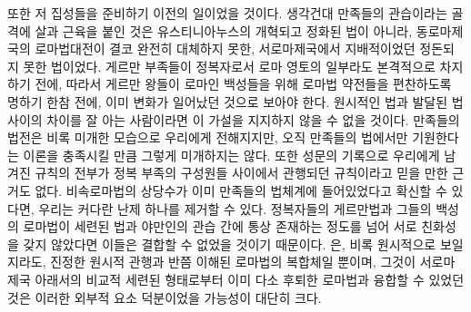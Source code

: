 또한 저 집성들을 준비하기 이전의 일이었을 것이다.
생각건대
만족들의 관습이라는 골격에 살과 근육을 붙인 것은
유스티니아누스의 개혁되고 정화된 법이 아니라,
동로마제국의 로마법대전이 결코 완전히 대체하지 못한,
서로마제국에서 지배적이었던
정돈되지 못한 법이었다.
게르만 부족들이
정복자로서
로마 영토의 일부라도 본격적으로 차지하기 전에,
따라서 게르만 왕들이 로마인 백성들을 위해
로마법 약전들을 편찬하도록 명하기 한참 전에,
이미 변화가 일어났던 것으로 보아야 한다.
원시적인 법과 발달된 법 사이의 차이를 잘 아는 사람이라면
이 가설을 지지하지 않을 수 없을 것이다.
%
만족들의 법전은
비록 미개한 모습으로 우리에게 전해지지만,
오직 만족들의 법에서만 기원한다는 이론을 충족시킬 만큼
그렇게 미개하지는 않다.
또한
성문의 기록으로 우리에게 남겨진 규칙의 전부가
정복 부족의 구성원들 사이에서 관행되던 규칙이라고
믿을 만한 근거도 없다.
비속로마법의 상당수가
이미 만족들의 법체계에 들어있었다고 확신할 수 있다면,
우리는 커다란 난제 하나를 제거할 수 있다.
정복자들의 게르만법과
그들의 백성의 로마법이
세련된 법과 야만인의 관습 간에 통상 존재하는 정도를 넘어
서로 친화성을 갖지 않았다면
이들은
결합할 수 없었을 것이기 때문이다.
은,
비록 원시적으로 보일지라도,
진정한 원시적 관행과 반쯤 이해된 로마법의 복합체일 뿐이며,
그것이
서로마제국 아래서의 비교적 세련된 형태로부터 이미 다소 후퇴한
로마법과 융합할 수 있었던 것은
이러한 외부적 요소 덕분이었을
가능성이 대단히 크다.

